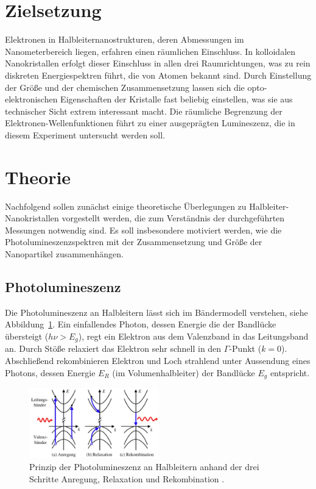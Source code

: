 \setcounter{page}{1}
\section*{Zielsetzung}
Elektronen in Halbleiternanostrukturen, deren Abmessungen im Nanometerbereich liegen,
erfahren einen räumlichen Einschluss. In kolloidalen Nanokristallen erfolgt dieser Einschluss
in allen drei Raumrichtungen, was zu rein diskreten Energiespektren führt, die von Atomen bekannt sind.
Durch Einstellung der Größe und der chemischen Zusammensetzung lassen sich die opto-elektronischen
Eigenschaften der Kristalle fast beliebig einstellen, was sie aus technischer Sicht extrem interessant macht.
Die räumliche Begrenzung der Elektronen-Wellenfunktionen führt zu einer ausgeprägten Lumineszenz, die
in diesem Experiment untersucht werden soll.

\section{Theorie}
\label{sec:theo}
Nachfolgend sollen zunächst einige theoretische Überlegungen zu Halbleiter-Nanokristallen vorgestellt werden, die
zum Verständnis der durchgeführten Messungen notwendig sind. Es soll insbesondere motiviert werden, wie die
Photolumineszenzspektren mit der Zusammensetzung und Größe der Nanopartikel zusammenhängen.

\subsection{Photolumineszenz}
Die Photolumineszenz an Halbleitern lässt sich im Bändermodell verstehen, siehe Abbildung~\ref{fig: pl}. Ein
einfallendes Photon, dessen Energie die der Bandlücke übersteigt ($h\nu > E_g$), regt ein Elektron aus dem
Valenzband in das Leitungsband an.
Durch Stöße relaxiert das Elektron sehr schnell in den $\Gamma$-Punkt ($k = 0$). Abschließend rekombinieren Elektron und Loch
strahlend unter Aussendung eines Photons, dessen Energie $E_R$ (im Volumenhalbleiter) der Bandlücke $E_g$ entspricht.

\begin{figure}
  \centering
  \includegraphics[width = 0.5\textwidth]{pics/PL.png}
  \caption{Prinzip der Photolumineszenz an Halbleitern anhand der drei Schritte Anregung, Relaxation und Rekombination \cite{anleitung_pl}.}
  \label{fig: pl}
\end{figure}


